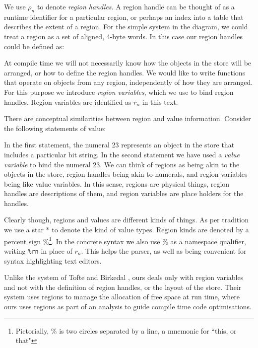 We use $\rho_n$ to denote \emph{region handles}. A region handle can be thought of as a runtime identifier for a particular region, or perhaps an index into a table that describes the extent of a region. For the simple system in the diagram, we could treat a region as a set of aligned, 4-byte words. In this case our region handles could be defined as:



At compile time we will not necessarily know how the objects in the store will be arranged, or how to define the region handles. We would like to write functions that operate on objects from any region, independently of how they are arranged. For this purpose we introduce \emph{region variables}, which we use to bind region handles. Region variables are identified as $r_n$ in this text.

There are conceptual similarities between region and value information. Consider the following statements of value:


In the first statement, the numeral 23 represents an object in the store that includes a particular bit string. In the second statement we have used a \emph{value variable} to bind the numeral 23. We can think of regions as being akin to the objects in the store, region handles being akin to numerals, and region variables being like value variables. In this sense, regions are physical things, region handles are descriptions of them, and region variables are place holders for the handles.

Clearly though, regions and values are different kinds of things. As per tradition we use a star * to denote the kind of value types. Region kinds are denoted by a percent sign \%\footnote{Pictorially, \% is two circles separated by a line, a mnemonic for ``this, or that"}. In the concrete syntax we also use \% as a namespace qualifier, writing \texttt{\%rn} in place of $r_n$. This helps the parser, as well as being convenient for syntax highlighting text editors.

Unlike the system of Tofte and Birkedal \cite{tofte:region-inference}, ours deals only with region variables and not with the definition of region handles, or the layout of the store. Their system uses regions to manage the allocation of free space at run time, where ours uses regions as part of an analysis to guide compile time code optimisations.

